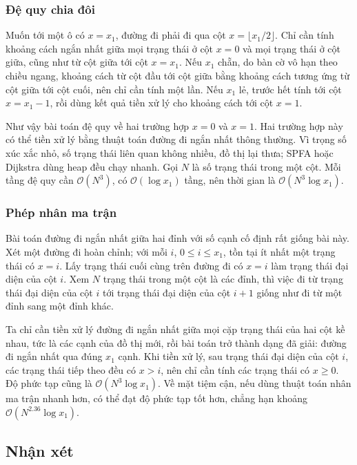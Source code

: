 \documentclass[11pt]{article}
\newcommand{\Oh}{\mathcal{O}}
\begin{document}
\subsubsection{Đệ quy chia đôi}

Muốn tới một ô có \(x=x_1\), đường đi phải đi qua cột
\(x=\lfloor x_1/2\rfloor\). Chỉ cần tính khoảng cách ngắn nhất giữa mọi trạng
thái ở cột \(x=0\) và mọi trạng thái ở cột giữa, cũng như từ cột giữa tới cột
\(x=x_1\). Nếu \(x_1\) chẵn, do bàn cờ vô hạn theo chiều ngang, khoảng cách
từ cột đầu tới cột giữa bằng khoảng cách tương ứng từ cột giữa tới cột cuối,
nên chỉ cần tính một lần. Nếu \(x_1\) lẻ, trước hết tính tới cột \(x=x_1-1\),
rồi dùng kết quả tiền xử lý cho khoảng cách tới cột \(x=1\).

Như vậy bài toán đệ quy về hai trường hợp \(x=0\) và \(x=1\). Hai trường hợp
này có thể tiền xử lý bằng thuật toán đường đi ngắn nhất thông thường. Vì
trọng số xúc xắc nhỏ, số trạng thái liên quan không nhiều, đồ thị lại thưa;
SPFA hoặc Dijkstra dùng heap đều chạy nhanh. Gọi \(N\) là số trạng thái trong
một cột. Mỗi tầng đệ quy cần \(\Oh(N^3)\), có \(\Oh(\log x_1)\) tầng, nên thời
gian là \(\Oh(N^3\log x_1)\).

\subsubsection{Phép nhân ma trận}

Bài toán đường đi ngắn nhất giữa hai đỉnh với số cạnh cố định rất giống bài
này. Xét một đường đi hoàn chỉnh; với mỗi \(i\), \(0\le i\le x_1\), tồn tại ít
nhất một trạng thái có \(x=i\). Lấy trạng thái cuối cùng trên đường đi có
\(x=i\) làm trạng thái đại diện của cột \(i\). Xem \(N\) trạng thái trong một
cột là các đỉnh, thì việc đi từ trạng thái đại diện của cột \(i\) tới trạng
thái đại diện của cột \(i+1\) giống như đi từ một đỉnh sang một đỉnh khác.

Ta chỉ cần tiền xử lý đường đi ngắn nhất giữa mọi cặp trạng thái của hai cột
kề nhau, tức là các cạnh của đồ thị mới, rồi bài toán trở thành dạng đã giải:
đường đi ngắn nhất qua đúng \(x_1\) cạnh. Khi tiền xử lý, sau trạng thái đại
diện của cột \(i\), các trạng thái tiếp theo đều có \(x>i\), nên chỉ cần tính
các trạng thái có \(x\ge 0\). Độ phức tạp cũng là \(\Oh(N^3\log x_1)\).
Về mặt tiệm cận, nếu dùng thuật toán nhân ma trận nhanh hơn, có thể đạt độ
phức tạp tốt hơn, chẳng hạn khoảng \(\Oh(N^{2.36}\log x_1)\).

\subsection{Nhận xét}
\end{document}

